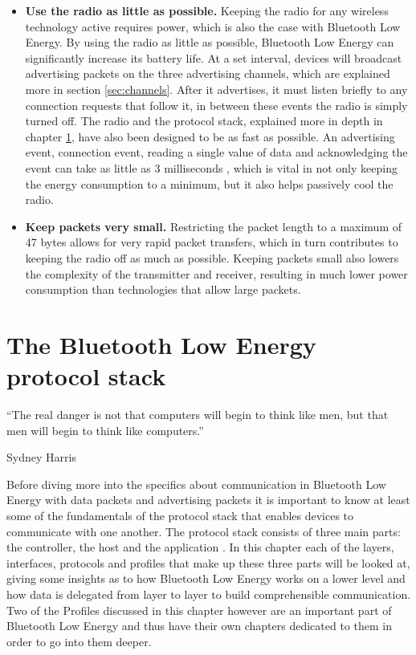 \documentclass[pdftex,a4paper,12pt,twoside]{report}
\begin{document}
\begin{itemize}
\item{\textbf{Use the radio as little as possible.} Keeping the radio for any wireless technology active requires power, which is also the case with Bluetooth Low Energy. By using the radio as little as possible, Bluetooth Low Energy can significantly increase its battery life. At a set interval, devices will broadcast advertising packets on the three advertising channels, which are explained more in section \ref{sec:channels}. After it advertises, it must listen briefly to any connection requests that follow it, in between these events the radio is simply turned off. The radio and the protocol stack, explained more in depth in chapter \ref{ch:protocolstack}, have also been designed to be as fast as possible. An advertising event, connection event, reading a single value of data and acknowledging the event can take as little as 3 milliseconds \citep{heydon2012bluetooth}, which is vital in not only keeping the energy consumption to a minimum, but it also helps passively cool the radio.}

\item{\textbf{Keep packets very small.} Restricting the packet length to a maximum of 47 bytes allows for very rapid packet transfers, which in turn contributes to keeping the radio off as much as possible. Keeping packets small also lowers the complexity of the transmitter and receiver, resulting in much lower power consumption than technologies that allow large packets.}
\end{itemize}

\chapter{The Bluetooth Low Energy protocol stack}
\label{ch:protocolstack}
\epigraph{``The real danger is not that computers will begin to think like men, but that men will begin to think like computers.''}{Sydney Harris}
Before diving more into the specifics about communication in Bluetooth Low Energy with data packets and advertising packets it is important to know at least some of the fundamentals of the protocol stack that enables devices to communicate with one another. The protocol stack consists of three main parts: the controller, the host and the application \citep{bluetooth2016training}. In this chapter each of the layers, interfaces, protocols and profiles that make up these three parts will be looked at, giving some insights as to how Bluetooth Low Energy works on a lower level and how data is delegated from layer to layer to build comprehensible communication. Two of the Profiles discussed in this chapter however are an important part of Bluetooth Low Energy and thus have their own chapters dedicated to them in order to go into them deeper.
\end{document}
